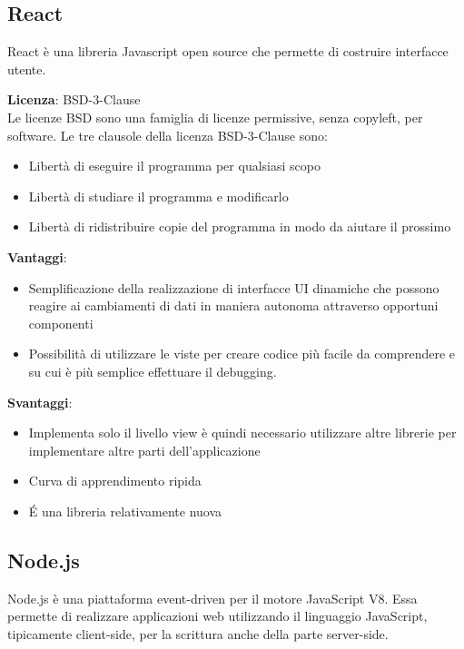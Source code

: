 \subsection{React}

React è una libreria Javascript open source che permette di costruire interfacce utente. 

\textbf{Licenza}: BSD-3-Clause \\
Le licenze BSD sono una famiglia di licenze permissive, senza copyleft, per software.
Le tre clausole della licenza BSD-3-Clause sono:

\begin{itemize}
	\item Libertà di eseguire il programma per qualsiasi scopo
	\item Libertà di studiare il programma e modificarlo
	\item Libertà di ridistribuire copie del programma in modo da aiutare il prossimo
	
\end{itemize}

\textbf{Vantaggi}: 
\begin{itemize}
	\item Semplificazione della realizzazione di interfacce UI dinamiche che possono reagire ai cambiamenti di dati in maniera autonoma attraverso opportuni componenti
	\item Possibilità di utilizzare le viste per creare codice più facile da comprendere e su cui è più semplice effettuare il debugging.
	
\end{itemize}

\textbf{Svantaggi}: 
\begin{itemize}
	\item Implementa solo il livello view è quindi necessario utilizzare altre librerie per implementare altre parti dell'applicazione
	\item Curva di apprendimento ripida
	\item \'E una libreria relativamente nuova
\end{itemize}

\subsection{Node.js}

Node.js è una piattaforma event-driven per il motore JavaScript V8. Essa permette di realizzare applicazioni web utilizzando il linguaggio JavaScript, tipicamente client-side, per la scrittura anche della parte server-side.

